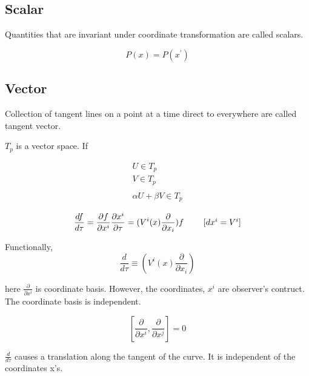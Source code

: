 \documentclass[12pt, letterpaper]{article}
\newcommand*{\1}{\hspace{1pt}}
\begin{document}
    \subsection*{Scalar}
    Quantities that are invariant under coordinate transformation are called scalars.

    \begin{equation*}
        P(x) = P(x^{'})
    \end{equation*}

    \subsection*{Vector}

    Collection of tangent lines on a point at a time direct to everywhere are called tangent vector.
    
    $T_{p}$ is a vector space. If 

    \begin{equation}
        \begin{split}
            U \in T_{p} \\
            V \in T_{p} \\ 
            \\ 
            \alpha U + \beta V \in T_{p}
        \end{split}
    \end{equation}

    \begin{align*}
        \frac{df}{d \tau} = \frac{\partial f}{\partial x^{i}} \frac{\partial x^{i}}{\partial \tau} = (V^{i}(x) \frac{\partial}{\partial x_{i}})f \tag*{ $[dx^{i} = V^{i}]$} \\   
    \end{align*}

    Functionally, 
    \begin{equation}
        \frac{d}{d \tau} \equiv  (V^{i}(x) \frac{\partial}{\partial x_{i}})
    \end{equation}

    here $\frac{\partial}{\partial x^{i}}$ is coordinate basis. However, the coordinates, $x^{i}$ are observer's contruct. The coordinate basis is independent. 

    \begin{equation}
        \left[ \frac{\partial}{\partial x^{i}}, \frac{\partial}{\partial x^{j}}\right] = 0 
    \end{equation}

    $\frac{d}{d \tau}$ causes a translation along the tangent of the curve. It is independent of the coordinates x's.
\end{document}
